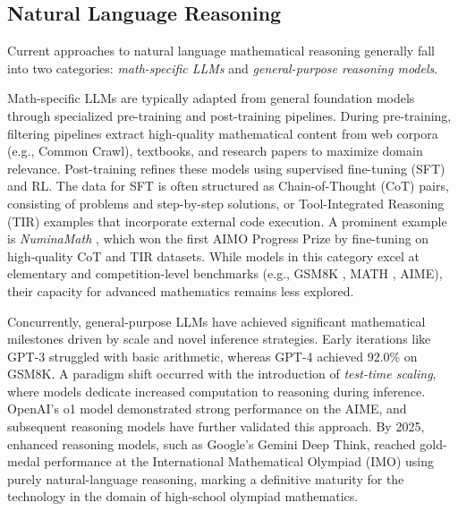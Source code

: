 \documentclass[11pt]{article}
\numberwithin{equation}{section}
\begin{document}
\subsection{Natural Language Reasoning}\label{subsec:nlr}

Current approaches to natural language mathematical reasoning generally fall into two categories: \textit{math-specific LLMs} and \textit{general-purpose reasoning models}.

Math-specific LLMs are typically adapted from general foundation models through specialized pre-training and post-training pipelines. During pre-training, filtering pipelines \cite{shao2024deepseekmath,yang2024qwen2} extract high-quality mathematical content from web corpora (e.g., Common Crawl), textbooks, and research papers to maximize domain relevance. Post-training refines these models using supervised fine-tuning (SFT) and RL. The data for SFT is often structured as Chain-of-Thought (CoT) \cite{wei2022chain} pairs, consisting of problems and step-by-step solutions, or Tool-Integrated Reasoning (TIR) \cite{goutora} examples that incorporate external code execution. A prominent example is \textit{NuminaMath} \cite{li2024numinamath}, which won the first AIMO Progress Prize by fine-tuning on high-quality CoT and TIR datasets. While models in this category \cite{azerbayev2024llemma,shao2024deepseekmath,yang2024qwen2,ying2024internlm} excel at elementary and competition-level benchmarks (e.g., GSM8K \cite{cobbe2021training}, MATH \cite{hendrycksmath2021}, AIME), their capacity for advanced mathematics remains less explored.

Concurrently, general-purpose LLMs have achieved significant mathematical milestones driven by scale and novel inference strategies. Early iterations like GPT-3 struggled with basic arithmetic, whereas GPT-4 \cite{achiam2023gpt} achieved 92.0\% on GSM8K. A paradigm shift occurred with the introduction of \textit{test-time scaling}, where models dedicate increased computation to reasoning during inference. OpenAI's o1 model demonstrated strong performance on the AIME, and subsequent reasoning models \cite{guo2025deepseek,qwq32b,yang2025qwen3,comanici2025gemini} have further validated this approach. By 2025, enhanced reasoning models, such as Google's Gemini Deep Think, reached gold-medal performance at the International Mathematical Olympiad (IMO) using purely natural-language reasoning, marking a definitive maturity for the technology in the domain of high-school olympiad mathematics.
\end{document}
